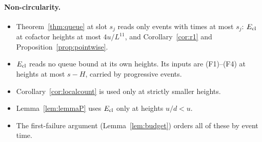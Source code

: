 \paragraph{Non-circularity.}
\begin{itemize}
\item Theorem~\ref{thm:queue} at slot $s_j$ reads only events with times at most $s_j$: $E_{\mathrm{cl}}$ at cofactor heights at most
  $4u/L^{11}$, and Corollary~\ref{cor:r1} and Proposition~\ref{prop:pointwise}.
\item $E_{\mathrm{cl}}$ reads no queue bound at its own heights. Its inputs are (F1)--(F4) at heights at most $s-H$, carried by
  progressive events.
\item Corollary~\ref{cor:localcount} is used only at strictly smaller heights.
\item Lemma~\ref{lem:lemmaP} uses $E_{\mathrm{cl}}$ only at heights $u/d<u$.
\item The first-failure argument (Lemma~\ref{lem:budget}) orders all of these by event time.
\end{itemize}
